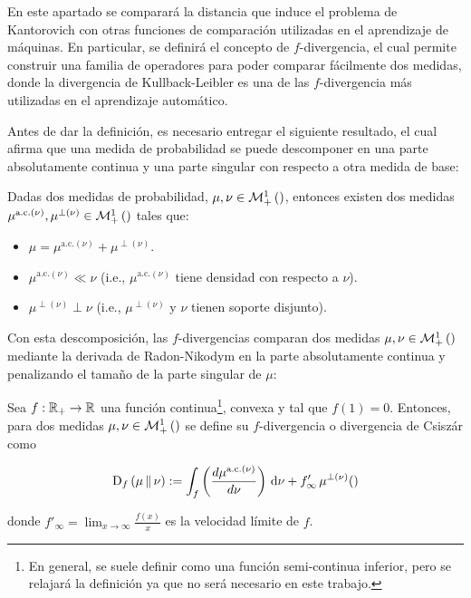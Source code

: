 En este apartado se comparará la distancia que induce el problema de Kantorovich con otras funciones de comparación utilizadas en el aprendizaje de máquinas. En particular, se definirá el concepto de $f$-divergencia, el cual permite construir una familia de operadores para poder comparar fácilmente dos medidas, donde la divergencia de Kullback-Leibler es una de las $f$-divergencia más utilizadas en el aprendizaje automático.

Antes de dar la definición, es necesario entregar el siguiente resultado, el cual afirma que una medida de probabilidad se puede descomponer en una parte absolutamente continua y una parte singular con respecto a otra medida de base:

\begin{teo}
	Dadas dos medidas de probabilidad, $\mu,\nu\in\mathcal{M}_+^1\left(\right)$, entonces existen dos medidas $\mu^{\text{a.c.}(\nu)},\mu^{\perp(\nu)}\in\mathcal{M}_+^1\left(\right)$ tales que:

	\begin{itemize}
		\item $\mu = \mu^{\text{a.c.}(\nu)} + \mu^{\perp(\nu)}$.
		\item $\mu^{\text{a.c.}(\nu)} \ll \nu$ (i.e., $\mu^{\text{a.c.}(\nu)}$ tiene densidad con respecto a $\nu$).
		\item $\mu^{\perp(\nu)} \perp \nu$ (i.e., $\mu^{\perp(\nu)}$ y $\nu$ tienen soporte disjunto).
	\end{itemize}
\end{teo}

Con esta descomposición, las $f$-divergencias comparan dos medidas $\mu,\nu\in\mathcal{M}_+^1\left(\right)$ mediante la derivada de Radon-Nikodym en la parte absolutamente continua y penalizando el tamaño de la parte singular de $\mu$:

\begin{defn}[$f$-divergencia]
	\label{defn:f_div}
	Sea $f:\mathbb{R}_+\to\mathbb{R}$ una función continua\footnote{En general, se suele definir como una función semi-continua inferior, pero se relajará la definición ya que no será necesario en este trabajo.}, convexa y tal que $f(1)=0$. Entonces, para dos medidas $\mu,\nu\in\mathcal{M}_+^1\left(\right)$ se define su $f$-divergencia o divergencia de Csiszár como

	\begin{equation}
		\label{eq:f_div}
		\operatorname{D}_f\left(\mu\,\|\,\nu\right)
		:= \int_ f\left(\frac{d\mu^{\text{a.c.}(\nu)}}{d\nu}\right) \,\operatorname{d}\!\nu + f'_\infty\, \mu^{\perp(\nu)}()
	\end{equation}

	donde $f'_\infty = \lim_{x\to\infty} \frac{f(x)}{x}$ es la velocidad límite de $f$.
\end{defn}

